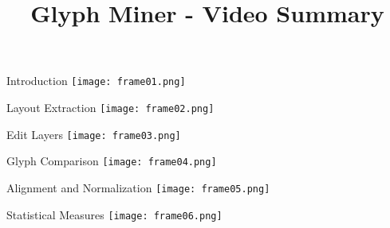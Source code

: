 \documentclass{beamer}
\title{Glyph Miner - Video Summary}
\author{}
\date{}
\begin{document}
\frame{\titlepage}


\begin{frame}{Introduction}
\texttt{[image: frame01.png]}
\caption*{This is Glyph Miner, a system for exploring and mining the structure and semantics of typefaces. It enables interactive visualization and analysis of glyphs — the individual characters in a font. The system is designed for tasks such as comparing glyphs, finding similarities across fonts, and creating new typeface designs.}
\end{frame}

\begin{frame}{Layout Extraction}
\texttt{[image: frame02.png]}
\caption*{We begin by selecting a font and loading its glyphs. Glyph Miner then extracts the layout of each glyph by tracing its contours and simplifying the geometry. This produces a graph-like structure where edges correspond to strokes or curves, and nodes indicate junctions or terminals.}
\end{frame}

\begin{frame}{Edit Layers}
\texttt{[image: frame03.png]}
\caption*{Layouts can be explored and edited interactively using layers. For example, we can highlight edges that form the main stems of a glyph. Other layers mark serifs, bowls, and other components. These layers are stored as annotations and can be turned on and off.}
\end{frame}

\begin{frame}{Glyph Comparison}
\texttt{[image: frame04.png]}
\caption*{Glyphs can be compared by loading multiple fonts side-by-side. Here, we visualize the letter “A” in five typefaces. The extracted layouts make it easy to spot differences in structure, such as stroke widths, proportions, and serif shapes.}
\end{frame}

\begin{frame}{Alignment and Normalization}
\texttt{[image: frame05.png]}
\caption*{To further support comparison, the layouts can be aligned and normalized. This makes structural similarities more apparent and helps with clustering or classification.}
\end{frame}

\begin{frame}{Statistical Measures}
\texttt{[image: frame06.png]}
\caption*{The system provides statistical measures of shape complexity, such as the number of edges, path length, and curvature. These can be visualized across fonts or plotted as histograms.}
\end{frame}
\end{document}
